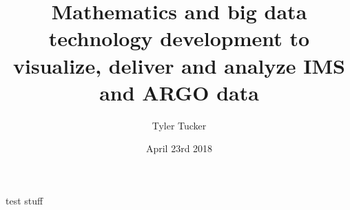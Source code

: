 \documentclass[11pt]{beamer}
\author{Tyler Tucker}
\title{Mathematics and big data technology development to visualize, deliver and analyze IMS and ARGO data}
\institute{San Diego State University}
\date{April 23rd 2018}
\begin{document}
\begin{frame}
\titlepage
\end{frame}


\begin{frame}
test stuff
\end{frame}
\end{document}
